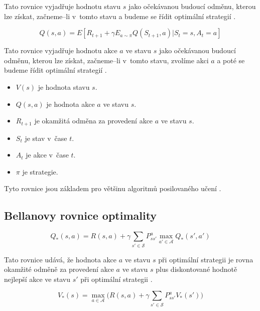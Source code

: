 Tato rovnice vyjadřuje hodnotu stavu $s$ jako očekávanou budoucí odměnu, kterou lze získat, začneme--li v~tomto stavu a budeme se řídit optimální strategií \cite{RL_basics,Dynamic_Programming_BELLMAN}.

\begin{equation}
  Q(s, a) = E[R_{t+1} + \gamma E_{a\sim\pi}Q(S_{t+1}, a) | S_t = s, A_t = a]\label{eq:bellman2}
\end{equation}

Tato rovnice vyjadřuje hodnotu akce $a$ ve stavu $s$ jako očekávanou budoucí odměnu, kterou lze získat, začneme--li v~tomto stavu, zvolíme akci $a$ a poté se budeme řídit optimální strategií \cite{RL_basics,Dynamic_Programming_BELLMAN}.

\begin{itemize}
  \item $V(s)$ je hodnota stavu $s$.
  \item $Q(s, a)$ je hodnota akce $a$ ve stavu $s$.
  \item $R_{t+1}$ je okamžitá odměna za provedení akce $a$ ve stavu $s$.
  \item $S_t$ je stav v~čase $t$.
  \item $A_t$ je akce v~čase $t$.
  \item $\pi$ je strategie.
\end{itemize}

Tyto rovnice jsou základem pro většinu algoritmů posilovaného učení \cite{RL_basics,Dynamic_Programming_BELLMAN}.

\subsection{Bellanovy rovnice optimality}\label{subsec:bellmanovy-rovnice-optimality}

\begin{equation}\label{eq:bellman_optimality1}
  Q_*(s, a) = R(s, a) + \gamma \sum_{s' \in \mathcal{S}} P_{ss'}^a \max_{a' \in \mathcal{A}} Q_*(s', a')
\end{equation}

Tato rovnice udává, že hodnota akce $a$ ve stavu $s$ při optimální strategii je rovna okamžité odměně za provedení akce $a$ ve stavu $s$ plus diskontované hodnotě nejlepší akce ve stavu $s'$ při optimální strategii \cite{RL_basics,Dynamic_Programming_BELLMAN}.

\begin{equation}\label{eq:bellman_optimality2}
  V_*(s) = \max_{a \in \mathcal{A}} \big( R(s, a) + \gamma \sum_{s' \in \mathcal{S}} P_{ss'}^a V_*(s') \big)
\end{equation}

